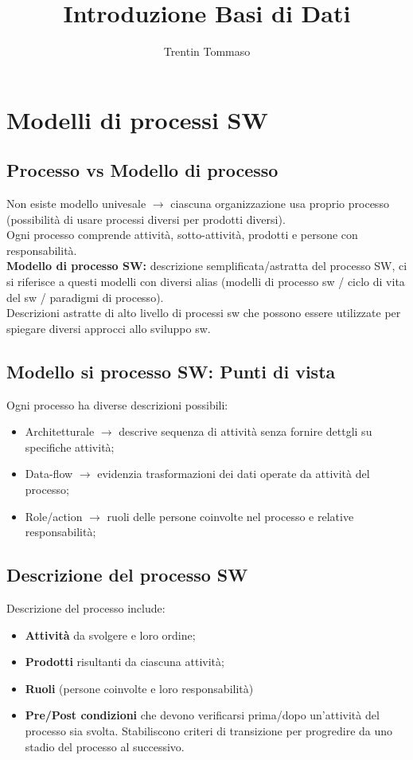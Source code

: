 \documentclass{article}
\title{Introduzione Basi di Dati}
\author{Trentin Tommaso}
\begin{document}
    \maketitle
    \tableofcontents
    \newpage

    \section{Modelli di processi SW}
      \subsection{Processo vs Modello di processo}
        Non esiste modello univesale $\rightarrow$ ciascuna organizzazione usa proprio processo (possibilità di usare processi diversi per prodotti diversi).\\
        Ogni processo comprende attività, sotto-attività, prodotti e persone con responsabilità.\\
        \textbf{Modello di processo SW:} descrizione semplificata/astratta del processo SW, ci si riferisce a questi modelli con diversi alias (modelli di processo sw / ciclo di vita del sw / paradigmi di processo).\\
        Descrizioni astratte di alto livello di processi sw che possono essere utilizzate per spiegare diversi approcci allo sviluppo sw.\\
      \subsection{Modello si processo SW: Punti di vista}
        Ogni processo ha diverse descrizioni possibili:
        \begin{itemize}
          \item Architetturale $\rightarrow$ descrive sequenza di attività senza fornire dettgli su specifiche attività;
          \item Data-flow $\rightarrow$ evidenzia trasformazioni dei dati operate da attività del processo;
          \item Role/action $\rightarrow$ ruoli delle persone coinvolte nel processo e relative responsabilità;
        \end{itemize}
      \subsection{Descrizione del processo SW}
        Descrizione del processo include:
        \begin{itemize}
          \item \textbf{Attività} da svolgere e loro ordine;
          \item \textbf{Prodotti} risultanti da ciascuna attività;
          \item \textbf{Ruoli} (persone coinvolte e loro responsabilità)
          \item \textbf{Pre/Post condizioni} che devono verificarsi prima/dopo un'attività del processo sia svolta. Stabiliscono criteri di transizione per progredire da uno stadio del processo al successivo.
        \end{itemize}
\end{document}
